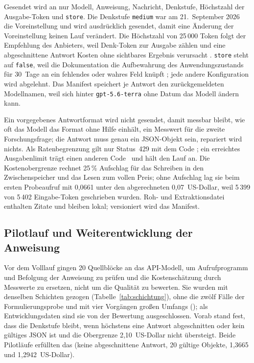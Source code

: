 \documentclass[11pt,a4paper]{report}
\begin{document}
Gesendet wird an  nur Modell, Anweisung, Nachricht,
Denkstufe, Höchstzahl der Ausgabe-Token und \texttt{store}. Die
Denkstufe \texttt{medium} war am 21.~September 2026 die Voreinstellung
und wird ausdrücklich gesendet, damit eine Änderung der Voreinstellung
keinen Lauf verändert. Die Höchstzahl von 25\,000 Token folgt der
Empfehlung des Anbieters, weil Denk-Token zur Ausgabe zählen und eine
abgeschnittene Antwort Kosten ohne sichtbares Ergebnis verursacht
\cite[Abschn.~Allocating space for reasoning]{openaireasoning}.
\texttt{store} steht auf \texttt{false}, weil die Dokumentation die
Aufbewahrung des Anwendungszustands für 30~Tage an ein fehlendes oder
wahres Feld knüpft \cite[Abschn.~Storage requirements and retention
controls per endpoint]{openaiyourdata}; jede andere Konfiguration wird
abgelehnt. Das Manifest speichert je Antwort den zurückgemeldeten
Modellnamen, weil sich hinter \texttt{gpt-5.6-terra} ohne Datum das
Modell ändern kann.

Ein vorgegebenes Antwortformat wird nicht gesendet, damit messbar
bleibt, wie oft das Modell das Format ohne Hilfe einhält, ein Messwert
für die zweite Forschungsfrage; die Antwort muss genau ein JSON-Objekt
sein, repariert wird nichts. Als Ratenbegrenzung gilt nur Status~429
mit dem Code ; ein erreichtes Ausgabenlimit
trägt einen anderen Code~\cite[Abschn.~Understand hard-limit
behavior]{openaispend} und hält den Lauf an. Die Kostenobergrenze rechnet
25\,\% Aufschlag für das Schreiben in den Zwischenspeicher und das Lesen
zum vollen Preis; ohne Aufschlag lag sie beim ersten Probeaufruf mit
0,0661 unter den abgerechneten 0,07~US-Dollar, weil 5\,399 von 5\,402
Eingabe-Token geschrieben wurden. Roh- und Extraktionsdatei enthalten
Zitate und bleiben lokal; versioniert wird das Manifest.

\subsection{Pilotlauf und Weiterentwicklung der Anweisung}
\label{subsec:impl-pilot}

Vor dem Volllauf gingen 20 Quellblöcke an das API-Modell, um
Aufrufprogramm und Befolgung der Anweisung zu prüfen und die
Kostenschätzung durch Messwerte zu ersetzen, nicht um die Qualität zu
bewerten. Sie wurden mit denselben Schichten gezogen
(Tabelle~\ref{tab:schichtung}), ohne die zwölf Fälle der
Formulierungsprobe und mit vier Vorgängen großen Umfangs
(); als Entwicklungsdaten sind sie von
der Bewertung ausgeschlossen. Vorab stand fest, dass die Denkstufe
bleibt, wenn höchstens eine Antwort abgeschnitten oder kein gültiges
JSON ist und die Obergrenze 2,10~US-Dollar nicht übersteigt. Beide
Pilotläufe erfüllten das (keine abgeschnittene Antwort, 20 gültige
Objekte, 1,3665 und 1,2942~US-Dollar).
\end{document}
